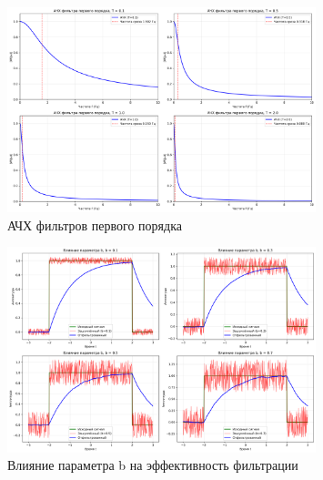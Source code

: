 \begin{figure}[H]
    \centering
    \includegraphics[width=0.8\textwidth]{images/task2/first_order_filter_frequency_response.png}
    \caption{АЧХ фильтров первого порядка}
    \label{fig:first_order_freq_response}
\end{figure}

\begin{figure}[H]
    \centering
    \includegraphics[width=0.8\textwidth]{images/task2/first_order_filter_b_influence.png}
    \caption{Влияние параметра b на эффективность фильтрации}
    \label{fig:first_order_b_influence}
\end{figure}

